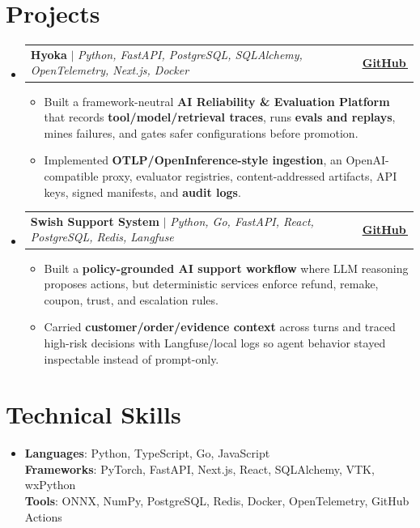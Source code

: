 \documentclass[letterpaper,11pt]{article}
\makeatletter
\newcommand{\bodyhref}[2]{\href{#1}{\underline{#2}\,\faExternalLink*}}
\newcommand{\resumeItem}[1]{\item{\fontsize{10.2pt}{11.5pt}\selectfont #1\vspace{-0.1pt}}}
\newcommand{\resumeProjectHeading}[2]{
    \item
    \begin{tabular*}{1.001\textwidth}{l@{\extracolsep{\fill}}r}
      \small#1 & \textbf{\small #2}\\
    \end{tabular*}\vspace{-3pt}
}
\newcommand{\resumeSubHeadingListStart}{\begin{itemize}[leftmargin=0.0in, label={}, itemsep=1.5pt, topsep=0pt, parsep=0pt, partopsep=0pt]}
\newcommand{\resumeSubHeadingListEnd}{\end{itemize}}
\newcommand{\resumeItemListStart}{\begin{itemize}[leftmargin=0.16in,itemsep=1.0pt,topsep=2.0pt,parsep=0pt,partopsep=0pt]}
\newcommand{\resumeItemListEnd}{\end{itemize}\vspace{-1pt}}
\makeatother
\begin{document}
\section{Projects}
\resumeSubHeadingListStart
\resumeProjectHeading
{\textbf{Hyoka} $|$ \emph{Python, FastAPI, PostgreSQL, SQLAlchemy, OpenTelemetry, Next.js, Docker}}{\bodyhref{https://github.com/unichronic/hyoka}{GitHub}}
\resumeItemListStart
\resumeItem{Built a framework-neutral \textbf{AI Reliability \& Evaluation Platform} that records \textbf{tool/model/retrieval traces}, runs \textbf{evals and replays}, mines failures, and gates safer configurations before promotion.}
\resumeItem{Implemented \textbf{OTLP/OpenInference-style ingestion}, an OpenAI-compatible proxy, evaluator registries, content-addressed artifacts, API keys, signed manifests, and \textbf{audit logs}.}
\resumeItemListEnd
\resumeProjectHeading
{\textbf{Swish Support System} $|$ \emph{Python, Go, FastAPI, React, PostgreSQL, Redis, Langfuse}}{\bodyhref{https://github.com/unichronic/swishagent}{GitHub}}
\resumeItemListStart
\resumeItem{Built a \textbf{policy-grounded AI support workflow} where LLM reasoning proposes actions, but deterministic services enforce refund, remake, coupon, trust, and escalation rules.}
\resumeItem{Carried \textbf{customer/order/evidence context} across turns and traced high-risk decisions with Langfuse/local logs so agent behavior stayed inspectable instead of prompt-only.}
\resumeItemListEnd
\resumeSubHeadingListEnd

\section{Technical Skills}
\begin{itemize}[leftmargin=0.15in, label={}, topsep=0pt, itemsep=0pt, parsep=0pt, partopsep=0pt]
  \item{\fontsize{9.6pt}{10.0pt}\selectfont
   \textbf{Languages}{: Python, TypeScript, Go, JavaScript} \\
   \textbf{Frameworks}{: PyTorch, FastAPI, Next.js, React, SQLAlchemy, VTK, wxPython} \\
   \textbf{Tools}{: ONNX, NumPy, PostgreSQL, Redis, Docker, OpenTelemetry, GitHub Actions} \\
  }
\end{itemize}
\end{document}
